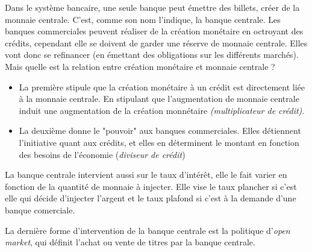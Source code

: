 Dans le système bancaire, une seule banque peut émettre des billets, créer de la monnaie centrale. C'est, comme son nom l'indique, la banque centrale. 
Les banques commerciales peuvent réaliser de la création monétaire en octroyant des crédits, cependant elle se doivent de garder une réserve de monnaie
centrale. Elles vont donc se refinancer (en émettant des obligations sur les différents marchés). Mais quelle est la relation entre création monétaire
et monnaie centrale ? 
\begin{itemize}
	\item La première stipule que la création monétaire à un crédit est directement liée à la monnaie centrale. En stipulant que l'augmentation de monnaie centrale induit une augmentation de la création monnétaire \emph{(multiplicateur de crédit)}.
	\item La deuxième donne le "pouvoir" aux banques commerciales. Elles détiennent l'initiative quant aux crédits, et elles en déterminent le montant
	en fonction des besoins de l'économie (\emph{diviseur de crédit}) 
\end{itemize}

La banque centrale intervient aussi sur le taux d'intérêt, elle le fait varier en fonction de la quantité de monnaie à injecter. Elle vise le taux plancher si c'est elle qui décide d'injecter l'argent et le taux plafond si c'est à la demande d'une banque comerciale. 

La dernière forme d'intervention de la banque centrale est la politique d'\emph{open market}, qui définit l'achat ou vente de titres par la banque centrale.




